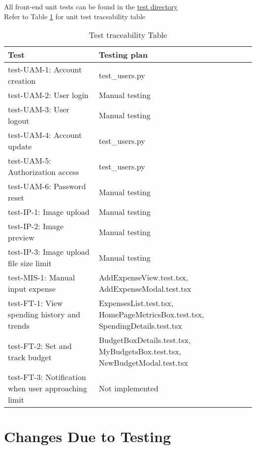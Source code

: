 \documentclass[12pt, titlepage]{article}
\begin{document}
All front-end unit tests can be found in the \href{https://github.com/PlutosCapstone/Plutos/tree/main/src/client/tests}{test directory}\\
Refer to Table \ref{tab:unit-testing} for unit test traceability table

\begin{table}[h]
  \centering
  \renewcommand{\arraystretch}{1.3}
  \begin{tabular}{| m{5cm} | m{8cm} |}
      \hline
      \textbf{Test} & \textbf{Testing plan} \\
      \hline
      test-UAM-1: Account creation & test\_users.py \\
      \hline
      test-UAM-2: User login & Manual testing \\
      \hline
      test-UAM-3: User logout & Manual testing \\
      \hline
      test-UAM-4: Account update & test\_users.py \\
      \hline
      test-UAM-5: Authorization access & test\_users.py \\
      \hline
      test-UAM-6: Password reset & Manual testing \\
      \hline
      test-IP-1: Image upload & Manual testing \\
      \hline
      test-IP-2: Image preview & Manual testing \\
      \hline
      test-IP-3: Image upload file size limit & Manual testing \\
      \hline
      test-MIS-1: Manual input expense & AddExpenseView.test.tsx, AddExpenseModal.test.tsx \\
      \hline
      test-FT-1: View spending history and trends & ExpensesList.test.tsx, HomePageMetricsBox.test.tsx, SpendingDetails.test.tsx \\
      \hline
      test-FT-2: Set and track budget & BudgetBoxDetails.test.tsx, MyBudgetsBox.test.tsx, NewBudgetModal.test.tsx \\
      \hline
      test-FT-3: Notification when user approaching limit & Not implemented \\
      \hline
  \end{tabular}
  \caption{Test traceability Table} \label{tab:unit-testing}
\end{table}


\section{Changes Due to Testing}
\end{document}
